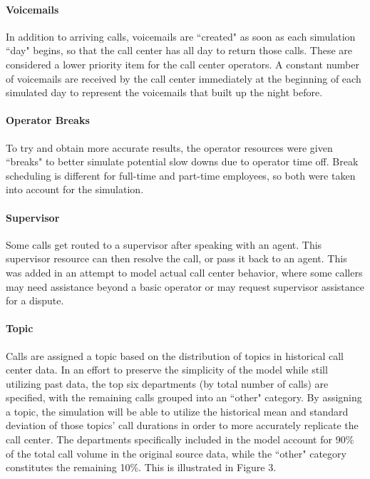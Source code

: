 \documentclass[12pt]{article}
\begin{document}
	\paragraph{Voicemails}
	
In addition to arriving calls, voicemails are ``created" as soon as each simulation ``day" begins, so that the call center has all day to return those calls.  These are considered a lower priority item for the call center operators.  A constant number of voicemails are received by the call center immediately at the beginning of each simulated day to represent the voicemails that built up the night before.

	\paragraph{Operator Breaks}
	
To try and obtain more accurate results, the operator resources were given ``breaks" to better simulate potential slow downs due to operator time off. Break scheduling is different for full-time and part-time employees, so both were taken into account for the simulation.

	\paragraph{Supervisor}
	
Some calls get routed to a supervisor after speaking with an agent.  This supervisor resource can then resolve the call, or pass it back to an agent.  This was added in an attempt to model actual call center behavior, where some callers may need assistance beyond a basic operator or may request supervisor assistance for a dispute. 

	\paragraph{Topic}

Calls are assigned a topic based on the distribution of topics in historical call center data.  In an effort to preserve the simplicity of the model while still utilizing past data, the top six departments (by total number of calls) are specified, with the remaining calls grouped into an ``other" category.  By assigning a topic, the simulation will be able to utilize the historical mean and standard deviation of those topics' call durations in order to more accurately replicate the call center.  The departments specifically included in the model account for 90\% of the total call volume in the original source data, while the ``other" category constitutes the remaining 10\%.  This is illustrated in Figure 3.
\end{document}
